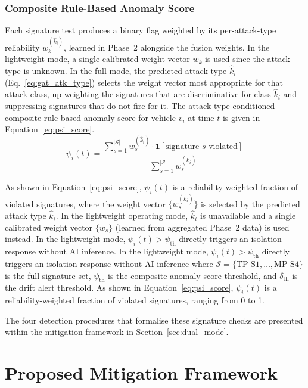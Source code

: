 \documentclass[12pt, a4paper]{report}
\begin{document}
\subsubsection{Composite Rule-Based Anomaly Score}

Each signature test produces a binary flag weighted by its
per-attack-type reliability $w_k^{(\hat{k}_i)}$, learned in Phase~2
alongside the fusion weights. In the lightweight mode, a single
calibrated weight vector $w_k$ is used since the attack type is
unknown. In the full mode, the predicted attack type $\hat{k}_i$
(Eq.~\ref{eq:gat_atk_type}) selects the weight vector most
appropriate for that attack class, up-weighting the signatures that
are discriminative for class $\hat{k}_i$ and suppressing signatures
that do not fire for it. The attack-type-conditioned composite
rule-based anomaly score for vehicle $v_i$ at time $t$ is given in
Equation~\ref{eq:psi_score}.
\begin{equation}
  \psi_i(t) = \frac{
  \displaystyle\sum_{s=1}^{|\mathcal{S}|}
  w_s^{(\hat{k}_i)} \cdot
  \mathbf{1}[\text{signature } s \text{ violated}]}
 {\displaystyle\sum_{s=1}^{|\mathcal{S}|} w_s^{(\hat{k}_i)}}
  \label{eq:psi_score}
\end{equation}

As shown in Equation~\ref{eq:psi_score}, $\psi_i(t)$ is a
reliability-weighted fraction of violated signatures, where the
weight vector $\{w_s^{(\hat{k}_i)}\}$ is selected by the predicted
attack type $\hat{k}_i$. In the lightweight operating mode,
$\hat{k}_i$ is unavailable and a single calibrated weight vector
$\{w_s\}$ (learned from aggregated Phase~2 data) is used instead.
In the lightweight mode, $\psi_i(t) > \psi_{\mathrm{th}}$ directly
triggers an isolation response without AI inference.
 In the lightweight mode, $\psi_i(t) > \psi_{\mathrm{th}}$
directly triggers an isolation response without AI inference where $\mathcal{S} = \{\text{TP-S1}, \ldots, \text{MP-S4}\}$ is the
full signature set, $\psi_{\mathrm{th}}$ is the composite anomaly score
threshold, and $\delta_{\mathrm{th}}$ is the drift alert threshold.
As shown in Equation~\ref{eq:psi_score}, $\psi_i(t)$ is a
reliability-weighted fraction of violated signatures, ranging from 0
to 1.

The four detection procedures that formalise these signature checks
are presented within the mitigation framework in
Section~\ref{sec:dual_mode}.


\section{Proposed Mitigation Framework}
\end{document}
